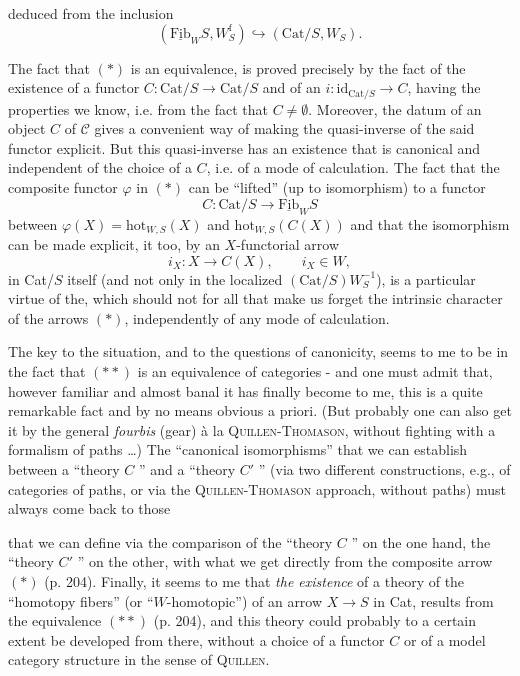 \documentclass[11pt]{article}
\newcommand{\printedpage}[1]{\marginpar{\footnotesize p.~#1}}
\newcommand{\msp}[1]{\marginpar{\footnotesize [#1]}}
\newcommand{\Fib}{\underline{\mathrm{Fib}}}
\newcommand{\Cat}{\mathrm{Cat}}
\newcommand{\hot}{\mathrm{hot}}
\newcommand{\id}{\mathrm{id}}
\begin{document}
\msp{page 205}deduced from the inclusion
\[
(\Fib_W S, W^{\mathrm{f}}_S) \hookrightarrow (\Cat/S, W_S).
\]

The fact that $(*)$ is an equivalence, is proved precisely by the fact of the existence of a functor $C : \Cat/S \longrightarrow \Cat/S$ and of an $i : \id_{\Cat/S} \longrightarrow C$, having the properties we know, i.e. from the fact that $C \neq \emptyset$. Moreover, the datum of an object $C$ of $\mathcal{C}$ gives a convenient way of making the quasi-inverse of the said functor explicit. But this quasi-inverse has an existence that is canonical and independent of the choice of a $C$, i.e. of a mode of calculation. The fact that the composite functor $\varphi$ in $(*)$ can be ``lifted'' (up to isomorphism) to a functor %
\[
C : \Cat/S \longrightarrow \Fib_W S
\]
between $\varphi(X) = \hot_{W,S}(X)$ and $\hot_{W,S}(C(X))$ and that the isomorphism can be made explicit, it too, by an $X$-functorial arrow
\[
i_X : X \longrightarrow C(X), \qquad i_X \in W,
\]
in Cat/$S$ itself (and not only in the localized $(\Cat/S)W_S^{-1}$),
\printedpage{134}
\msp{page 206}is a particular virtue of the, which should not for all that make us forget the intrinsic character of the arrows $(*)$, independently of any mode of calculation.

{\reversemarginpar\marginnote{$\|$}}%
The key to the situation, and to the questions of canonicity, seems to me to be in the fact that $(**)$ is an equivalence of categories - and one must admit that, however familiar and almost banal it has finally become to me, this is a quite remarkable fact and by no means obvious a priori. (But probably one can also get it by the general \textit{fourbis} (gear) à la \textsc{Quillen-Thomason}, without fighting with a formalism of paths \dots) The ``canonical isomorphisms'' that we can establish between a ``theory $C$ '' and a ``theory $C'$ '' (via two different constructions, e.g., of categories of paths, or via the \textsc{Quillen-Thomason} approach, without paths) must always come back to those

\msp{page 207}that we can define via the comparison of the ``theory $C$ '' on the one hand, the ``theory $C'$ '' on the other, with what we get directly from the composite arrow $(*)$ (p. 204). Finally, it seems to me that \textit{the existence} of a theory of the ``homotopy fibers'' (or ``$W$-homotopic'') of an arrow $X \longrightarrow S$ in Cat, results from the equivalence $(**)$ (p. 204), and this theory could probably to a certain extent be developed from there, without a choice of a functor $C$ or of a model category structure in the sense of \textsc{Quillen}. %
\end{document}
